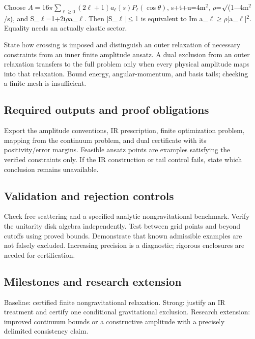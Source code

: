 \documentclass[
  11pt,
]{article}
\begin{document}
Choose \(A=16\pi\sum_{\ell\ge0}(2\ell+1)a_\ell(s)P_\ell(\cos\theta)\),
s+t+u=4m\ensuremath{{}^{2}},
\ensuremath{\rho}=\ensuremath{\surd}(1\ensuremath{-}4m\ensuremath{{}^{2}}/s),
and S\_\ensuremath{\ell}=1+2i\ensuremath{\rho}a\_\ensuremath{\ell}. Then
|S\_\ensuremath{\ell}|\ensuremath{\le}1 is equivalent to Im
a\_\ensuremath{\ell}\ensuremath{\ge}\ensuremath{\rho}|a\_\ensuremath{\ell}|\ensuremath{{}^{2}}.
Equality needs an actually elastic sector.

State how crossing is imposed and distinguish an outer relaxation of
necessary constraints from an inner finite amplitude ansatz. A dual
exclusion from an outer relaxation transfers to the full problem only
when every physical amplitude maps into that relaxation. Bound energy,
angular-momentum, and basis tails; checking a finite mesh is
insufficient.

\subsection{Required outputs and proof obligations}

Export the amplitude conventions, IR prescription, finite optimization
problem, mapping from the continuum problem, and dual certificate with
its positivity/error margins. Feasible ansatz points are examples
satisfying the verified constraints only. If the IR construction or tail
control fails, state which conclusion remains unavailable.

\subsection{Validation and rejection controls}

Check free scattering and a specified analytic nongravitational
benchmark. Verify the unitarity disk algebra independently. Test between
grid points and beyond cutoffs using proved bounds. Demonstrate that
known admissible examples are not falsely excluded. Increasing precision
is a diagnostic; rigorous enclosures are needed for certification.

\subsection{Milestones and research extension}

Baseline: certified finite nongravitational relaxation. Strong: justify
an IR treatment and certify one conditional gravitational exclusion.
Research extension: improved continuum bounds or a constructive
amplitude with a precisely delimited consistency claim.
\end{document}
